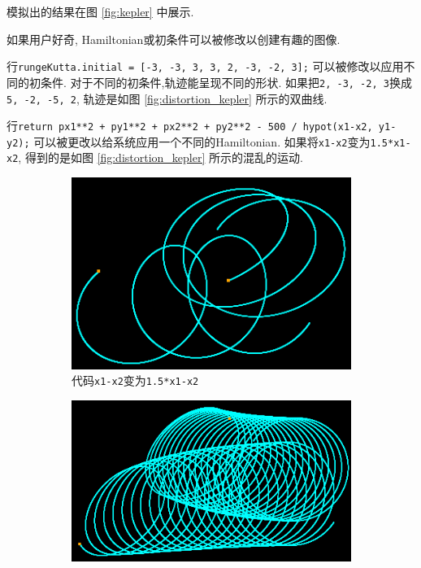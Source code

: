 \documentclass[12pt]{article}
\begin{document}
模拟出的结果在图 \ref{fig:kepler} 中展示.

如果用户好奇, Hamiltonian或初条件可以被修改以创建有趣的图像.

行\texttt{rungeKutta.initial = [-3, -3, 3, 3, 2, -3, -2, 3];}
可以被修改以应用不同的初条件.
对于不同的初条件,轨迹能呈现不同的形状.
如果把\texttt{2, -3, -2, 3}换成\texttt{5, -2, -5, 2},
轨迹是如图 \ref{fig:distortion_kepler} 所示的双曲线.

行\texttt{return px1**2 + py1**2 + px2**2 + py2**2 - 500 / hypot(x1-x2, y1-y2);}
可以被更改以给系统应用一个不同的Hamiltonian.
如果将\texttt{x1-x2}变为\texttt{1.5*x1-x2},
得到的是如图 \ref{fig:distortion_kepler} 所示的混乱的运动.

\begin{figure}[h]
  \centering
  \begin{subfigure}[b]{0.4\linewidth}
    \includegraphics[width=\linewidth]{distortion_kepler.png}
    \caption{代码\texttt{x1-x2}变为\texttt{1.5*x1-x2}}
  \end{subfigure}
  \begin{subfigure}[b]{0.4\linewidth}
    \includegraphics[width=\linewidth]{distortion2_kepler.png}

\end{subfigure}
\end{figure}
\end{document}
